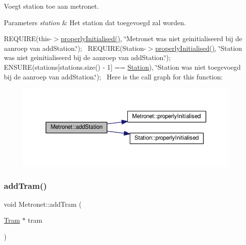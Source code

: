 Voegt station toe aan metronet. 


\begin{DoxyParams}{Parameters}
{\em station} & Het station dat toegevoegd zal worden.\\
\hline
\end{DoxyParams}
R\+E\+Q\+U\+I\+RE(this-\/$>$\hyperlink{class_metronet_a3d2adce29a947f162924279b766de645}{properly\+Initialised()}, \char`\"{}\+Metronet was niet geinitialiseerd bij de aanroep van add\+Station.\char`\"{});~\newline
R\+E\+Q\+U\+I\+RE(Station-\/$>$\hyperlink{class_metronet_a3d2adce29a947f162924279b766de645}{properly\+Initialised()}, \char`\"{}\+Station was niet geinitialiseerd bij de aanroep van add\+Station.\char`\"{});~\newline
E\+N\+S\+U\+RE(stations\mbox{[}stations.\+size() -\/ 1\mbox{]} == \hyperlink{class_station}{Station}), \char`\"{}\+Station was niet toegevoegd bij de aanroep van add\+Station.\char`\"{});~\newline
Here is the call graph for this function\+:
\nopagebreak
\begin{figure}[H]
\begin{center}
\leavevmode
\includegraphics[width=350pt]{class_metronet_ac7f4069e577cd4dddb1e166923df3ecb_cgraph}
\end{center}
\end{figure}
\mbox{\label{class_metronet_a3a01132772f4a367d83af40a3c02e224}} 
\subsubsection{\texorpdfstring{add\+Tram()}{addTram()}}
{\footnotesize\ttfamily void Metronet\+::add\+Tram (\begin{DoxyParamCaption}\item[{\hyperlink{class_tram}{Tram} $\ast$}]{tram }\end{DoxyParamCaption})}



